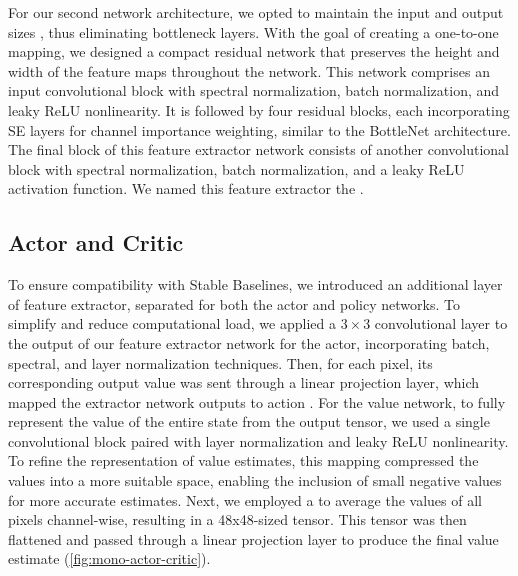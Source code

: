 \noindent For our second network architecture, we opted to maintain the input and output sizes , thus eliminating bottleneck layers. With the goal of creating a one-to-one mapping, we designed a compact residual network that preserves the height and width of the feature maps throughout the network. This network comprises an input convolutional block with spectral normalization, batch normalization, and leaky ReLU nonlinearity. It is followed by four residual blocks, each incorporating SE layers for channel importance weighting, similar to the BottleNet architecture. The final block of this feature extractor network consists of another convolutional block with spectral normalization, batch normalization, and a leaky ReLU activation function. We named this feature extractor the .

\subsection{Actor and Critic}
\label{sec:mono-network-actor-critic}

\noindent To ensure compatibility with Stable Baselines, we introduced an additional layer of feature extractor, separated for both the actor and policy networks. To simplify and reduce computational load, we applied a $3\times3$ convolutional layer to the output of our feature extractor network for the actor, incorporating batch, spectral, and layer normalization techniques. Then, for each pixel, its corresponding output value was sent through a linear projection layer, which mapped the extractor network outputs to action . For the value network, to fully represent the value of the entire state from the output tensor, we used a single convolutional block paired with layer normalization and leaky ReLU nonlinearity. To refine the representation of value estimates, this mapping compressed the values into a more suitable space, enabling the inclusion of small negative values for more accurate estimates. Next, we employed a  \cite{lin2014network} to average the values of all pixels channel-wise, resulting in a 48x48-sized tensor. This tensor was then flattened and passed through a linear projection layer to produce the final value estimate (\autoref{fig:mono-actor-critic}).

